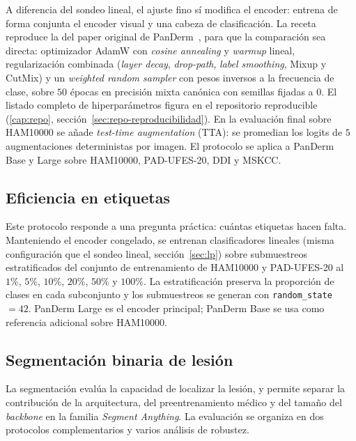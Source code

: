 A diferencia del sondeo lineal, el ajuste fino sí modifica el
encoder: entrena de forma conjunta el encoder visual y una cabeza de
clasificación. La receta reproduce la del paper original de
PanDerm~\cite{panderm2025}, para que la comparación sea directa:
optimizador AdamW con \emph{cosine annealing} y \emph{warmup}
lineal, regularización combinada (\emph{layer decay},
\emph{drop-path}, \emph{label smoothing}, Mixup y CutMix) y un
\emph{weighted random sampler} con pesos inversos a la frecuencia de
clase, sobre $50$ épocas en precisión mixta canónica con semillas
fijadas a $0$. El listado completo de hiperparámetros figura en el
repositorio reproducible (\ref{cap:repo},
sección~\ref{sec:repo-reproducibilidad}). En la evaluación final
sobre HAM10000 se añade \emph{test-time augmentation} (TTA): se
promedian los logits de $5$ augmentaciones deterministas por imagen.
El protocolo se aplica a PanDerm Base y Large sobre HAM10000,
PAD-UFES-20, DDI y MSKCC.

\subsection{Eficiencia en etiquetas}
\label{sec:label-eff}

Este protocolo responde a una pregunta práctica: cuántas etiquetas
hacen falta. Manteniendo el encoder congelado, se entrenan
clasificadores lineales (misma configuración que el sondeo lineal,
sección~\ref{sec:lp}) sobre submuestreos estratificados del
conjunto de entrenamiento de HAM10000 y PAD-UFES-20 al $1\%$,
$5\%$, $10\%$, $20\%$, $50\%$ y $100\%$. La
estratificación preserva la proporción de clases en cada subconjunto
y los submuestreos se generan con \texttt{random\_state}~$=42$.
PanDerm Large es el encoder principal; PanDerm Base se usa como
referencia adicional sobre HAM10000.

\subsection{Segmentación binaria de lesión}
\label{sec:segmentacion}

La segmentación evalúa la capacidad de localizar la lesión, y permite
separar la contribución de la arquitectura, del preentrenamiento médico
y del tamaño del \emph{backbone} en la familia \emph{Segment Anything}.
La evaluación se organiza en dos protocolos complementarios y varios
análisis de robustez.

